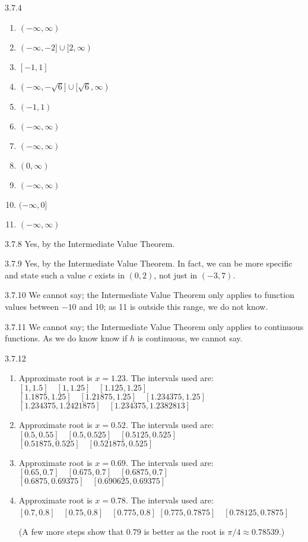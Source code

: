 \begin{Answer}{3.7.4}
\begin{enumerate}
\item {$(-\infty,\infty)$
}
\item {$(-\infty,-2]\cup [2,\infty)$
}
\item {$[-1,1]$
}
\item {$(-\infty,-\sqrt{6}]\cup [\sqrt{6},\infty)$
}
\item {$(-1,1)$
}
\item {$(-\infty,\infty)$
}
\item {$(-\infty,\infty)$
}
\item {$(0,\infty)$
}
\item {$(-\infty,\infty)$
}
\item
{$(-\infty,0]$
}
\item
{$(-\infty,\infty)$
}
\end{enumerate}
\end{Answer}
\begin{Answer}{3.7.8}
{Yes, by the Intermediate Value Theorem.
}
\end{Answer}
\begin{Answer}{3.7.9}
  {Yes, by the Intermediate Value Theorem. In fact, we can be more specific and state such a value $c$ exists in $(0,2)$, not just in $(-3,7)$.
  }
\end{Answer}
\begin{Answer}{3.7.10}
 {We cannot say; the Intermediate Value Theorem only applies to function values between $-10$ and 10; as 11 is outside this range, we do not know.
  }
\end{Answer}
\begin{Answer}{3.7.11}
 {We cannot say; the Intermediate Value Theorem only applies to continuous functions. As we do know know if $h$ is continuous, we cannot say.
  }
\end{Answer}
\begin{Answer}{3.7.12}
\begin{enumerate}
\item {Approximate root is $x=1.23$. The intervals used are:
$[1,1.5] \quad [1,1.25] \quad [1.125,1.25]$
$[1.1875,1.25]\quad [1.21875,1.25]\quad [1.234375,1.25]$
$[1.234375,1.2421875]\quad [1.234375,1.2382813]$
}
\item {Approximate root is $x=0.52$. The intervals used are:
$[0.5,0.55] \quad [0.5,0.525] \quad [0.5125,0.525]$
$[0.51875,0.525]\quad [0.521875,0.525]$
}
\item {Approximate root is $x=0.69$. The intervals used are:
$[0.65,0.7] \quad [0.675,0.7] \quad [0.6875,0.7]$
$[0.6875,0.69375]\quad [0.690625,0.69375]$
}
\item {Approximate root is $x=0.78$. The intervals used are:
$[0.7,0.8] \quad [0.75,0.8] \quad [0.775,0.8]$
$[0.775,0.7875]\quad [0.78125,0.7875]$

(A few more steps show that $0.79$ is better as the root is $\pi/4 \approx 0.78539$.)
}
\end{enumerate}
\end{Answer}
